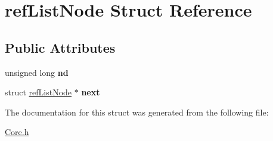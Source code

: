\hypertarget{structrefListNode}{\section{ref\-List\-Node Struct Reference}
\label{structrefListNode}
}
\subsection*{Public Attributes}
\begin{DoxyCompactItemize}
\item 
\hypertarget{structrefListNode_aad950dd70f5d0b14f39b1f67dfc01580}{unsigned long {\bfseries nd}}\label{structrefListNode_aad950dd70f5d0b14f39b1f67dfc01580}

\item 
\hypertarget{structrefListNode_abc7e153a5f4c6f5652cecd19da99cbce}{struct \hyperlink{structrefListNode}{ref\-List\-Node} $\ast$ {\bfseries next}}\label{structrefListNode_abc7e153a5f4c6f5652cecd19da99cbce}

\end{DoxyCompactItemize}


The documentation for this struct was generated from the following file\-:\begin{DoxyCompactItemize}
\item 
\hyperlink{Core_8h}{Core.\-h}\end{DoxyCompactItemize}

